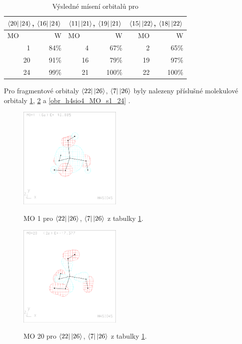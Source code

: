 \documentclass[
  digital, %
  table,   %
  lof,     %
  lot,     %
]{fithesis3}
\begin{document}
\begin{table}[htbp]
\caption{Výsledné mísení orbitalů pro }
\begin{center}
\begin{tabular}{|r|r|r|r|r|r|}
\hline 
\multicolumn{2}{|c|}{$\bra{20}\ket{24}$, $\bra{16}\ket{24}$} & \multicolumn{2}{|c|}{$\bra{11}\ket{21}$, $\bra{19}\ket{21}$}& \multicolumn{2}{|c|}{$\bra{15}\ket{22}$, $\bra{18}\ket{22}$} \\
\hline \hline
\multicolumn{1}{|l|}{MO} & \multicolumn{1}{r|}{W} & \multicolumn{1}{l|}{MO} & \multicolumn{1}{r|}{W} & MO & \multicolumn{1}{r|}{W} \\ \hline
1 & 84\% & 4 & 67\% & 2 & 65\% \\ \hline
20 & 91\% & 16 & 79\% & 19 & 97\% \\ \hline
24 & 99\% & 21 & 100\% &  22& 100\% \\ \hline
\end{tabular}
\end{center}
\label{tab_h4sio4_vysledky}
\end{table}
    Pro fragmentové orbitaly $\bra{22}\ket{26}$, $\bra{7}\ket{26}$ byly nalezeny příslušné molekulové orbitaly \ref{obr_h4sio4_MO_s1_1}, \ref{obr_h4sio4_MO_s1_20} a \ref{obr_h4sio4_MO_s1_24} .
  
  \begin{figure}[h]
\caption{MO 1 pro $\bra{22}\ket{26}$, $\bra{7}\ket{26}$ z tabulky \ref{tab_h4sio4_vysledky}.  }
  \center
  \includegraphics[width=5cm]{h4sio4_obrazky/s1_1.eps}
  \label{obr_h4sio4_MO_s1_1}
  \end{figure}

\begin{figure}[h]
\caption{MO 20 pro $\bra{22}\ket{26}$, $\bra{7}\ket{26}$ z tabulky \ref{tab_h4sio4_vysledky}.  }
  \center
  \includegraphics[width=5cm]{h4sio4_obrazky/s1_20.eps}
  \label{obr_h4sio4_MO_s1_20}
  \end{figure}
\end{document}
